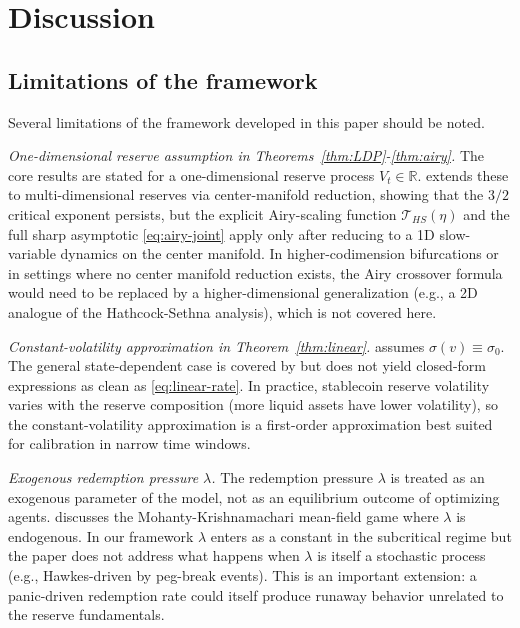 \documentclass[11pt,a4paper]{article}
\theoremstyle{plain}
\theoremstyle{definition}
\newcommand{\R}{\mathbb{R}}
\begin{document}
\section{Discussion}
\label{sec:discussion}

\subsection{Limitations of the framework}

Several limitations of the framework developed in this paper should be noted.

\emph{One-dimensional reserve assumption in Theorems~\ref{thm:LDP}-\ref{thm:airy}.} The core results are stated for a one-dimensional reserve process $V_t \in \R$.  extends these to multi-dimensional reserves via center-manifold reduction, showing that the $3/2$ critical exponent persists, but the explicit Airy-scaling function $\mathcal T_{HS}(\eta)$ and the full sharp asymptotic \eqref{eq:airy-joint} apply only after reducing to a 1D slow-variable dynamics on the center manifold. In higher-codimension bifurcations or in settings where no center manifold reduction exists, the Airy crossover formula would need to be replaced by a higher-dimensional generalization (e.g., a 2D analogue of the Hathcock-Sethna analysis), which is not covered here.

\emph{Constant-volatility approximation in Theorem~\ref{thm:linear}.}  assumes $\sigma(v) \equiv \sigma_0$. The general state-dependent case is covered by  but does not yield closed-form expressions as clean as \eqref{eq:linear-rate}. In practice, stablecoin reserve volatility varies with the reserve composition (more liquid assets have lower volatility), so the constant-volatility approximation is a first-order approximation best suited for calibration in narrow time windows.

\emph{Exogenous redemption pressure $\lambda$.} The redemption pressure $\lambda$ is treated as an exogenous parameter of the model, not as an equilibrium outcome of optimizing agents.  discusses the Mohanty-Krishnamachari mean-field game \cite{MohantyKrishnamachari2026} where $\lambda$ is endogenous. In our framework $\lambda$ enters as a constant in the subcritical regime but the paper does not address what happens when $\lambda$ is itself a stochastic process (e.g., Hawkes-driven by peg-break events). This is an important extension: a panic-driven redemption rate could itself produce runaway behavior unrelated to the reserve fundamentals.
\end{document}
